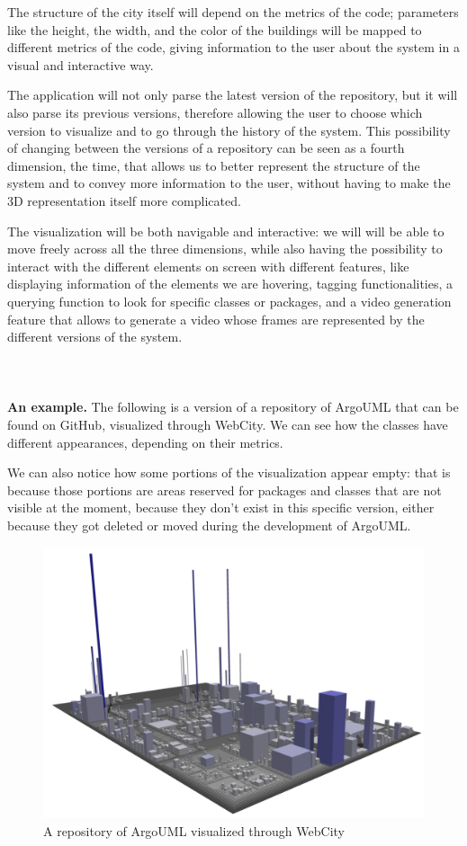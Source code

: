 \documentclass[]{usiinfbachelorproject}
\begin{document}
The structure of the city itself will depend on the metrics of the code; parameters like the height, the width, and the color of the buildings will be mapped to different metrics of the code, giving information to the user about the system in a visual and interactive way.

The application will not only parse the latest version of the repository, but it will also parse its previous versions, therefore allowing the user to choose which version to visualize and to go through the history of the system. This possibility of changing between the versions of a repository can be seen as a fourth dimension, the time, that allows us to better represent the structure of the system and to convey more information to the user, without having to make the 3D representation itself more complicated.

The visualization will be both navigable and interactive: we will will be able to move freely across all the three dimensions, while also having the possibility to interact with the different elements on screen with different features, like displaying information of the elements we are hovering, tagging functionalities, a querying function to look for specific classes or packages, and a video generation feature that allows to generate a video whose frames are represented by the different versions of the system.\\\\\\\\

\textbf{An example.} The following is a version of a repository of ArgoUML that can be found on GitHub, visualized through WebCity. We can see how the classes have different appearances, depending on their metrics.

We can also notice how some portions of the visualization appear empty: that is because those portions are areas reserved for packages and classes that are not visible at the moment, because they don't exist in this specific version, either because they got deleted or moved during the development of ArgoUML.
\begin{figure} [H]
\centering
\includegraphics[width=.8\textwidth]{pictures/example.png}
\caption{A repository of ArgoUML visualized through WebCity}
\label{fig:example}
\end{figure}
\end{document}
